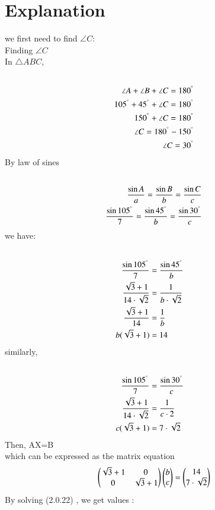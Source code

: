 \documentclass[journal,12pt,twocolumn]{IEEEtran}
\begin{document}
\section{Explanation}
we first need to find $\angle C$:
\\
Finding $\angle C$
\\
In $\triangle ABC$,
\begin{align}
\\
\angle A+\angle B+\angle C = 180^{\degree}
\\
105^{\degree}+45^{\degree}+\angle C = 180^{\degree}
\\
150^{\degree}+\angle C = 180^{\degree}
\\
\angle C = 180^{\degree}-150^{\degree}
\\
\angle C = 30^{\degree}
\\
\end{align}
By law of sines
\begin{align}
\\
\frac{\sin A}{a}=\frac{\sin B}{b}=\frac{\sin C}{c}
\\
\frac{\sin 105^{\degree}}{7}=\frac{\sin 45^{\degree}}{b}=\frac{\sin 30^{\degree}}{c}
\\
\end{align}
we have:
\begin{align}
\\
\frac{\sin 105^{\degree}}{7} &=\frac{\sin 45^{\degree}}{b}
\\
\frac{\sqrt{3}+1}{14\cdot\sqrt{2}} &=\frac{1}{b\cdot\sqrt{2}}
\\
\frac{\sqrt{3}+1}{14} &=\frac{1}{b}
\\
b(\sqrt{3}+1) &=14
\end{align}
similarly,
\begin{align}
\\
\frac{\sin 105^{\degree}}{7} &=\frac{\sin 30^{\degree}}{c}
\\
\frac{\sqrt{3}+1}{14\cdot\sqrt{2}} &=\frac{1}{c\cdot2}
\\
c(\sqrt{3}+1) &={7\cdot\sqrt{2}}
\\
\end{align}
Then, AX=B
\\
which can be expressed as the matrix equation
\begin{align}
\begin{pmatrix}\sqrt{3}+1 & 0 \\0& \sqrt{3}+1\end{pmatrix}\begin{pmatrix}b\\c\end{pmatrix} = \begin{pmatrix}14\\7\cdot\sqrt{2}\end{pmatrix}
\end{align}
By solving (2.0.22) , we get values :
\end{document}
